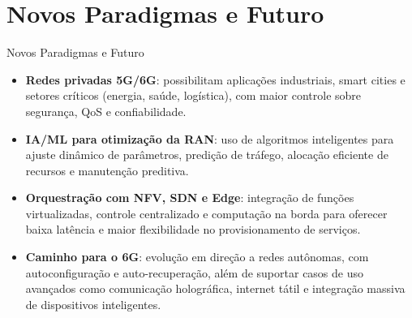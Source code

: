 \section{Novos Paradigmas e Futuro}

\begin{frame}{Novos Paradigmas e Futuro}
\small
\begin{itemize}
  \item \textbf{Redes privadas 5G/6G}: possibilitam aplicações industriais, smart cities e setores críticos (energia, saúde, logística), com maior controle sobre segurança, QoS e confiabilidade.
  \item \textbf{IA/ML para otimização da RAN}: uso de algoritmos inteligentes para ajuste dinâmico de parâmetros, predição de tráfego, alocação eficiente de recursos e manutenção preditiva.
  \item \textbf{Orquestração com NFV, SDN e Edge}: integração de funções virtualizadas, controle centralizado e computação na borda para oferecer baixa latência e maior flexibilidade no provisionamento de serviços.
  \item \textbf{Caminho para o 6G}: evolução em direção a redes autônomas, com autoconfiguração e auto-recuperação, além de suportar casos de uso avançados como comunicação holográfica, internet tátil e integração massiva de dispositivos inteligentes.
\end{itemize}
\end{frame}
